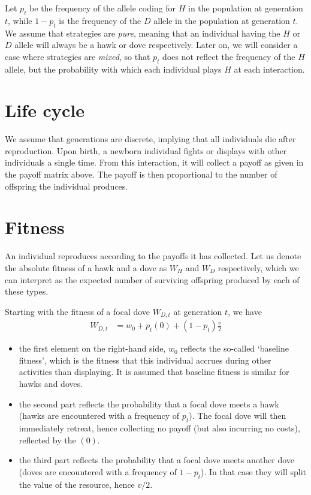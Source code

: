 \documentclass[
]{book}
\providecommand{\tightlist}{%
  \setlength{\itemsep}{0pt}\setlength{\parskip}{0pt}}
\begin{document}
Let \(p_{t}\) be the frequency of the allele coding for \(H\) in the population at generation \(t\), while \(1-p_{t}\) is the frequency of the \(D\) allele in the population at generation \(t\). We assume that strategies are \emph{pure}, meaning that an individual having the \(H\) or \(D\) allele will always be a hawk or dove respectively. Later on, we will consider a case where strategies are \emph{mixed}, so that \(p_{t}\) does not reflect the frequency of the \(H\) allele, but the probability with which each individual plays \(H\) at each interaction.

\section{Life cycle}\label{life-cycle}

We assume that generations are discrete, implying that all individuals die after reproduction. Upon birth, a newborn individual fights or displays with other individuals a single time. From this interaction, it will collect a payoff as given in the payoff matrix above. The payoff is then proportional to the number of offspring the individual produces.

\section{Fitness}\label{fitness}

An individual reproduces according to the payoffs it has collected. Let us denote the absolute fitness of a hawk and a dove as \(W_{H}\) and \(W_{D}\) respectively, which we can interpret as the expected number of surviving offspring produced by each of these types.

Starting with the fitness of a focal dove \(W_{D,t}\) at generation \(t\), we have
\begin{align}
W_{D,t} &= w_{0} + p_{t} (0) + \left(1-p_{t} \right) \frac{v}{2}
\end{align}

\begin{itemize}
\tightlist
\item
  the first element on the right-hand side, \(w_{0}\) reflects the so-called `baseline fitness', which is the fitness that this individual accrues during other activities than displaying. It is assumed that baseline fitness is similar for hawks and doves.
\item
  the second part reflects the probability that a focal dove meets a hawk (hawks are encountered with a frequency of \(p_{t}\)). The focal dove will then immediately retreat, hence collecting no payoff (but also incurring no costs), reflected by the \((0)\).
\item
  the third part reflects the probability that a focal dove meets another dove (doves are encountered with a frequency of \(1-p_{t}\)). In that case they will split the value of the resource, hence \(v/2\).
\end{itemize}
\end{document}
